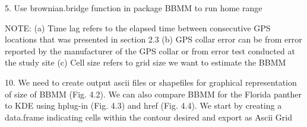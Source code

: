 \documentclass[
  letterpaper,
]{book}
\newenvironment{Shaded}{\begin{snugshade}}{\end{snugshade}}
\newcommand{\AttributeTok}[1]{\textcolor[rgb]{0.40,0.45,0.13}{#1}}
\newcommand{\DecValTok}[1]{\textcolor[rgb]{0.68,0.00,0.00}{#1}}
\newcommand{\FunctionTok}[1]{\textcolor[rgb]{0.28,0.35,0.67}{#1}}
\newcommand{\NormalTok}[1]{\textcolor[rgb]{0.00,0.23,0.31}{#1}}
\newcommand{\OtherTok}[1]{\textcolor[rgb]{0.00,0.23,0.31}{#1}}
\newcommand{\SpecialCharTok}[1]{\textcolor[rgb]{0.37,0.37,0.37}{#1}}
\begin{document}
5. Use brownian.bridge function in package BBMM to run home range

\begin{Shaded}
\end{Shaded}

NOTE: (a) Time lag refers to the elapsed time between consecutive GPS
locations that was presented in section 2.3 (b) GPS collar error can be
from error reported by the manufacturer of the GPS collar or from error
test conducted at the study site (c) Cell size refers to grid size we
want to estimate the BBMM

10. We need to create output ascii files or shapefiles for graphical
representation of size of BBMM (Fig. 4.2). We can also compare BBMM for
the Florida panther to KDE using hplug-in (Fig. 4.3) and href (Fig.
4.4). We start by creating a data.frame indicating cells within the
contour desired and export as Ascii Grid
\end{document}
